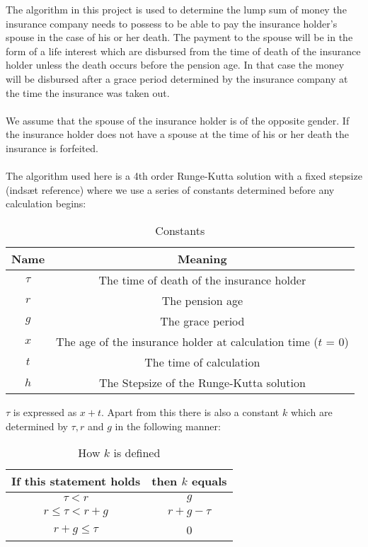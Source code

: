 
The algorithm in this project is used to determine the lump sum of money the insurance company needs to possess to be able to pay the insurance holder's spouse in the case of his or her death. The payment to the spouse will be in the form of a life interest which are disbursed from the time of death of the insurance holder unless the death occurs before the pension age. In that case the money will be disbursed after a grace period determined by the insurance company at the time the insurance was taken out. 
\\
\\ We assume that the spouse of the insurance holder is of the opposite gender. If the insurance holder does not have a spouse at the time of his or her death the insurance is forfeited.
\\
\\The algorithm used here is a 4th order Runge-Kutta solution with a fixed stepsize (indsæt reference) where we use a series of constants determined before any calculation begins:

\begin{table}
\begin{center}
\begin{tabular}[t]{|c|c|}
	\hline
\textbf{Name}&\textbf{Meaning}\\\hline
$\tau$&The time of death of the insurance holder\\\hline
$r$&The pension age\\\hline
$g$&The grace period\\\hline
$x$&The age of the insurance holder at calculation time ($t$ = 0)\\\hline
$t$&The time of calculation\\\hline
$h$&The Stepsize of the Runge-Kutta solution\\\hline
\end{tabular}
\end{center}
\caption{Constants}
\label{table:constants}
\end{table}

$\tau$ is expressed as $x+t$. Apart from this there is also a constant $k$ which are determined by $\tau, r$ and $g$ in the following manner:

\begin{table}
\begin{center}
	\begin{tabular}[t]{|c|c|}
		\hline
		\textbf{If this statement holds}&\textbf{then $k$ equals}\\\hline
		$\tau < r$&$g$\\\hline
		$r \leq \tau < r + g$& $r + g - \tau$\\\hline
		$r + g \leq \tau$&0\\\hline
	\end{tabular}
\end{center}
\caption{How $k$ is defined}
\end{table}

